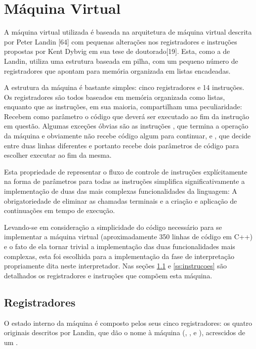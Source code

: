 \section{Máquina Virtual}
\label{sec:maquina-virtual}

A máquina virtual utilizada é baseada na arquitetura de máquina virtual
 descrita por Peter Landin [64] com pequenas alterações nos
registradores e instruções propostas por Kent Dybvig em sua tese de
doutorado[19]. Esta, como a de Landin, utiliza uma estrutura baseada em pilha,
com um pequeno número de registradores que apontam para memória organizada em
listas encadeadas. 

A estrutura da máquina é bastante simples: cinco registradores e 14 instruções.
Os registradores são todos baseados em memória organizada como listas, enquanto
que as instruções, em sua maioria, compartilham uma peculiaridade: Recebem como parâmetro
o código que deverá ser executado ao fim da instrução em questão. Algumas
exceções óbvias são as instruções , que termina a operação da
máquina e obviamente não recebe código algum para continuar, e , que
decide entre duas linhas diferentes e portanto recebe dois parâmetros de código
para escolher executar ao fim da mesma.

Esta propriedade de representar o fluxo de controle de instruções
explícitamente na forma de parâmetros para todas as instruções simplifica
significativamente a implementação de duas das mais complexas funcionalidades
da linguagem: A obrigatoriedade de eliminar as chamadas terminais e a criação e
aplicação de continuações em tempo de execução.

Levando-se em consideração a simplicidade do código necessário para se
implementar a máquina virtual  (aproximadamente 350 linhas de código
em C++) e o fato de ela tornar trivial a implementação das duas funcionalidades
mais complexas, esta foi escolhida para a implementação da fase de
interpretação propriamente dita neste interpretador. Nas seções
\ref{ss:registradores} e \ref{ss:instrucoes} são detalhados os registradores e
instruções que compõem esta máquina.

\subsection{Registradores}
\label{ss:registradores}

O estado interno da máquina é composto pelos seus cinco registradores: os
quatro originais descritos por Landin, que dão o nome à máquina (,
,  e ), acrescidos de um
.

